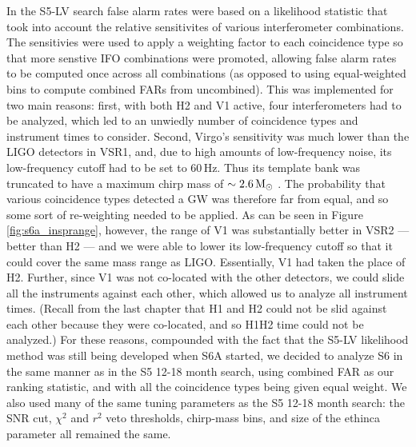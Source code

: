 In the \ac{S5}-LV search false alarm rates were based on a likelihood statistic that took into account the relative sensitivites of various interferometer combinations. The sensitivies were used to apply a weighting factor to each coincidence type so that more senstive \ac{IFO} combinations were promoted, allowing false alarm rates to be computed once across all combinations (as opposed to using equal-weighted bins to compute combined \acp{FAR} from uncombined). This was implemented for two main reasons: first, with both H2 and V1 active, four interferometers had to be analyzed, which led to an unwiedly number of coincidence types and instrument times to consider. Second, Virgo's sensitivity was much lower than the \ac{LIGO} detectors in VSR1, and, due to high amounts of low-frequency noise, its low-frequency cutoff had to be set to $60\,$Hz. Thus its template bank was truncated to have a maximum chirp mass of $\sim2.6\,\mathrm{M_\odot}$ \cite{ref:s5lvc}. The probability that various coincidence types detected a \ac{GW} was therefore far from equal, and so some sort of re-weighting needed to be applied. As can be seen in Figure \ref{fig:s6a_insprange}, however, the range of V1 was substantially better in \ac{VSR2} --- better than H2 --- and we were able to lower its low-frequency cutoff so that it could cover the same mass range as \ac{LIGO}. Essentially, V1 had taken the place of H2. Further, since V1 was not co-located with the other detectors, we could slide all the instruments against each other, which allowed us to analyze all instrument times. (Recall from the last chapter that H1 and H2 could not be slid against each other because they were co-located, and so H1H2 time could not be analyzed.) For these reasons, compounded with the fact that the \ac{S5}-LV likelihood method was still being developed when S6A started, we decided to analyze \ac{S6} in the same manner as in the \ac{S5} 12-18 month search, using combined \ac{FAR} as our ranking statistic, and with all the coincidence types being given equal weight. We also used many of the same tuning parameters as the \ac{S5} 12-18 month search: the \ac{SNR} cut, $\chi^2$ and $r^2$ veto thresholds, chirp-mass bins, and size of the ethinca parameter all remained the same.

